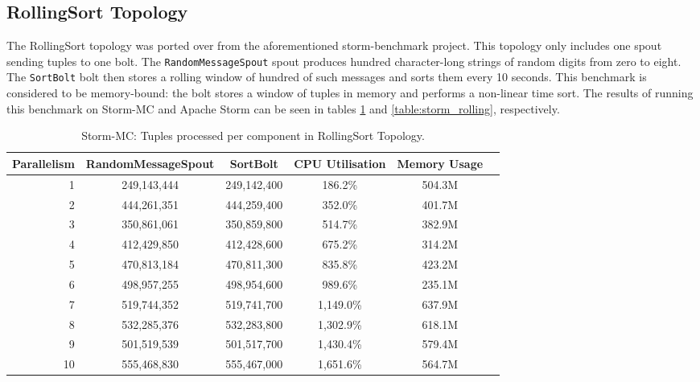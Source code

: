 \subsection{RollingSort Topology}

The RollingSort topology was ported over from the aforementioned storm-benchmark project. This topology only includes one spout sending tuples to one bolt. The \texttt{RandomMessageSpout} spout produces hundred character-long strings of random digits from zero to eight. The \texttt{SortBolt} bolt then stores a rolling window of hundred of such messages and sorts them every 10 seconds. This benchmark is considered to be memory-bound: the bolt stores a window of tuples in memory and performs a non-linear time sort. The results of running this benchmark on Storm-MC and Apache Storm can be seen in tables \ref{table:storm_mc_rolling} and \ref{table:storm_rolling}, respectively.

\begin{table}[!htb]
\begin{adjustwidth}{-0.5in}{-0.5in}
\centering
\small
\begin{tabular}{@{}rccccl@{}}
    {Parallelism} & {RandomMessageSpout} & {SortBolt} & {CPU Utilisation} & {Memory Usage} \\ \toprule
    1 & {249,143,444} & {249,142,400} & {186.2\%} & {504.3M} \\
    2 & {444,261,351} & {444,259,400} & {352.0\%} & {401.7M} \\
    3 & {350,861,061} & {350,859,800} & {514.7\%} & {382.9M} \\
    4 & {412,429,850} & {412,428,600} & {675.2\%} & {314.2M} \\
    5 & {470,813,184} & {470,811,300} & {835.8\%} & {423.2M} \\
    6 & {498,957,255} & {498,954,600} & {989.6\%} & {235.1M} \\
    7 & {519,744,352} & {519,741,700} & {1,149.0\%} & {637.9M} \\
    8 & {532,285,376} & {532,283,800} & {1,302.9\%} & {618.1M} \\
    9 & {501,519,539} & {501,517,700} & {1,430.4\%} & {579.4M} \\
    10 & {555,468,830} & {555,467,000} & {1,651.6\%} & {564.7M} \\ 
\end{tabular}
\caption{Storm-MC: Tuples processed per component in RollingSort Topology.}
\label{table:storm_mc_rolling}
\end{adjustwidth}
\end{table}

